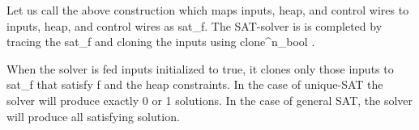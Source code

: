 \documentclass[preprint]{sigplanconf}
\newcommand{\xcomment}[2]{\textbf{#1:~\textsl{#2}}}
\newcommand{\roshan}[1]{\xcomment{Roshan}{#1}}
\begin{document}
\begin{center}
\end{center}  


Let us call the above construction which maps inputs, heap, and
control wires to inputs, heap, and control wires as {{sat_f}}. The
SAT-solver is is completed by tracing the {{sat_f}} and cloning the
inputs using {{clone^n_{bool} }}.

\begin{center}
\end{center}

When the solver is fed inputs initialized to {{true}}, it clones only
those inputs to {{sat_f}} that satisfy {{f}} and the heap
constraints. In the case of unique-SAT the solver will produce exactly
0 or 1 solutions. In the case of general SAT, the solver will produce
all satisfying solution. 
\end{document}

